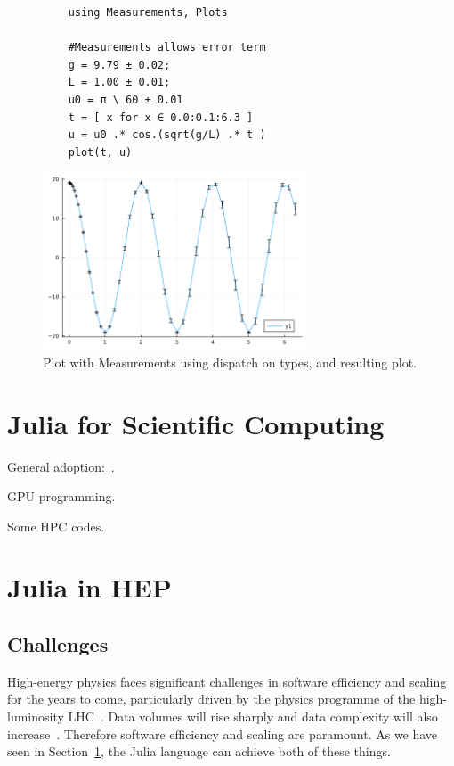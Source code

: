 \documentclass{webofc}
\begin{document}
\begin{figure}[!ht]
    

    \begin{verbatim}
    using Measurements, Plots

    #Measurements allows error term
    g = 9.79 ± 0.02; 
    L = 1.00 ± 0.01;
    u0 = π \ 60 ± 0.01
    t = [ x for x ∈ 0.0:0.1:6.3 ]
    u = u0 .* cos.(sqrt(g/L) .* t )
    plot(t, u)
    \end{verbatim}

    \includegraphics[width=0.7\textwidth]{errorbars.png}

    \caption{Plot with Measurements using dispatch on types, and resulting plot.}
    \label{code:plotmeasure}
    \end{figure}


\section{Julia for Scientific Computing}
\label{sec:juliascicomp}

General adoption:~\cite{perkel-julia-science}.

GPU programming.

Some HPC codes.

\section{Julia in HEP}

\subsection{Challenges}

High-energy physics faces significant challenges in software efficiency and
scaling for the years to come, particularly driven by the physics programme of
the high-luminosity LHC~\cite{hsfcwp}. Data volumes will rise sharply and data
complexity will also
increase~\cite{CERN-LHCC-2022-005,Software:2815292,Valassi2021}. Therefore
software efficiency and scaling are paramount. As we have seen in
Section~\ref{sec:juliascicomp}, the Julia language can achieve both of these
things.
\end{document}
